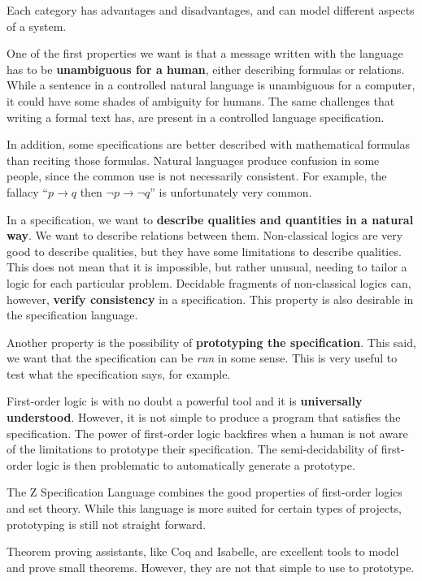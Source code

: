 Each category has advantages and disadvantages, and can model different aspects of a system.

One of the first properties we want is that a message written with the language has to be \textbf{unambiguous for a human}, either describing formulas or relations.
While a sentence in a controlled natural language is unambiguous for a computer, it could have some shades of ambiguity for humans.
The same challenges that writing a formal text has, are present in a controlled language specification.

In addition, some specifications are better described with mathematical formulas than reciting those formulas.
Natural languages produce confusion in some people, since the common use is not necessarily consistent.
For example, the fallacy ``$p \to q$ then $\lnot p \to \lnot q$'' is unfortunately very common.

In a specification, we want to \textbf{describe qualities and quantities in a natural way}.
We want to describe relations between them.
Non-classical logics are very good to describe qualities, but they have some limitations to describe qualities.
This does not mean that it is impossible, but rather unusual, needing to tailor a logic for each particular problem.
Decidable fragments of non-classical logics can, however, \textbf{verify consistency} in a specification.
This property is also desirable in the specification language.

Another property is the possibility of \textbf{prototyping the specification}.
This said, we want that the specification can be \textit{run} in some sense.
This is very useful to test what the specification says, for example.

First-order logic is with no doubt a powerful tool and it is \textbf{universally understood}.
However, it is not simple to produce a program that satisfies the specification.
The power of first-order logic backfires when a human is not aware of the limitations to prototype their specification.
The semi-decidability of first-order logic is then problematic to automatically generate a prototype.

The Z Specification Language combines the good properties of first-order logics and set theory.
While this language is more suited for certain types of projects, prototyping is still not straight forward.

Theorem proving assistants, like Coq and Isabelle, are excellent tools to model and prove small theorems.
However, they are not that simple to use to prototype.

